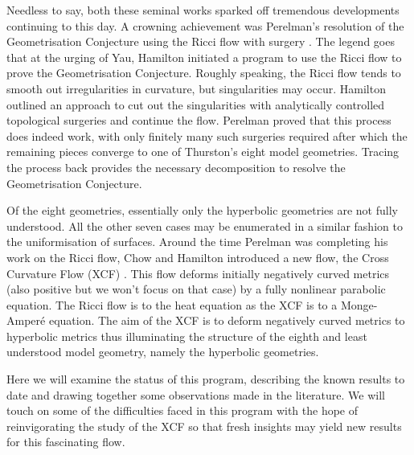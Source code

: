 \documentclass{cambridge7a}
\renewcommand{\~}{\tilde}
\renewcommand{\-}{\bar}
\newcommand{\8}{\infty}
\begin{document}
Needless to say, both these seminal works sparked off tremendous developments continuing to this day. A crowning achievement was Perelman's resolution of the Geometrisation Conjecture using the Ricci flow with surgery \cite{2003math......7245P,2003math......3109P,2002math.....11159P}. The legend goes that at the urging of Yau, Hamilton initiated a program to use the Ricci flow to prove the Geometrisation Conjecture. Roughly speaking, the Ricci flow  tends to smooth out irregularities in curvature, but singularities may occur. Hamilton outlined an approach to cut out the singularities with analytically controlled topological surgeries and continue the flow. Perelman proved that this process does indeed work, with only finitely many such surgeries required after which the remaining pieces converge to one of Thurston's eight model geometries. Tracing the process back provides the necessary decomposition to resolve the Geometrisation Conjecture.

Of the eight geometries, essentially only the hyperbolic geometries are not fully understood. All the other seven cases may be enumerated in a similar fashion to the uniformisation of surfaces. Around the time Perelman was completing his work on the Ricci flow, Chow and Hamilton introduced a new flow, the Cross Curvature Flow (XCF) \cite{MR2055396}. This flow deforms initially negatively curved metrics (also positive but we won't focus on that case) by a fully nonlinear parabolic equation. The Ricci flow is to the heat equation as the XCF is to a Monge-Amper\'e equation. The aim of the XCF is to deform negatively curved metrics to hyperbolic metrics thus illuminating the structure of the eighth and least understood model geometry, namely the hyperbolic geometries.

Here we will examine the status of this program, describing the known results to date and drawing together some observations made in the literature. We will touch on some of the difficulties faced in this program with the hope of reinvigorating the study of the XCF so that fresh insights may yield new results for this fascinating flow.
\end{document}
